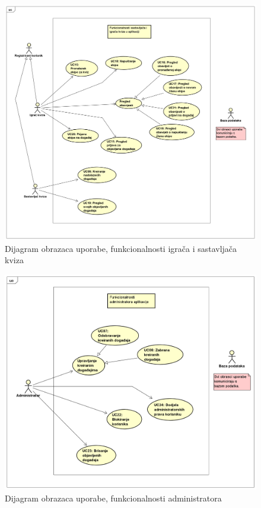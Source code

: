 				\begin{figure}[H]
					\includegraphics[width=\textwidth]{dijagrami/UseCaseDiagram2.PNG} 
					\caption{Dijagram obrazaca uporabe, funkcionalnosti igrača i sastavljača kviza}
					\label{fig:UseCaseDiagram2}
				\end{figure}
			
				\begin{figure}[H]
					\includegraphics[width=\textwidth]{dijagrami/UseCaseDiagram3.PNG} 
					\caption{Dijagram obrazaca uporabe, funkcionalnosti administratora}
					\label{fig:UseCaseDiagram3}
				\end{figure}
				\eject		
				
